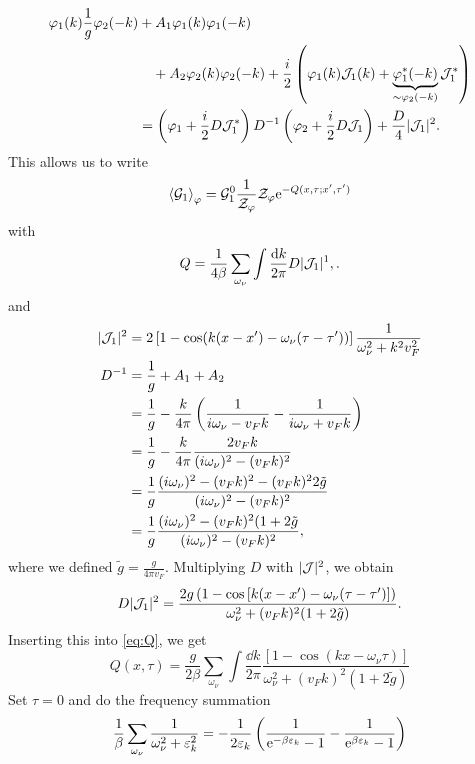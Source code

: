 \begin{align*}
\varphi_1(k)\frac{1}{g}\varphi_2(-k) &+ A_1\varphi_1(k)\varphi_1(-k) \\
&\quad + A_2\varphi_2(k)\varphi_2(-k) + \frac i2\left(\varphi_1(k)\mathcal{J}_1(k) + \underbrace{\varphi_1^*(-k)}_{\sim\varphi_2(-k)}\mathcal{J}_1^*\right) \\
&= \left(\varphi_1+\frac{i}{2}D\mathcal{J}_1^*\right)D^{-1}\left(\varphi_2+\frac{i}{2}D\mathcal{J}_1\right) + \frac{D}{4}|\mathcal{J}_1|^2. 
\end{align*}
This allows us to write
\begin{equation}
\label{eq:gre_almost_final}
\ev{\gre_1}_\p = \gre_1^0\frac{1}{\Z_\p}\Z_\p\e^{-Q(x, \tau;x',\tau')}
\end{equation}
with
\begin{equation}
\label{eq:Q}
Q = \frac{1}{4\beta}\sum_{\omega_\nu}\int\frac{\dd{k}}{2\pi}D|\mathcal{J}_1|^1, .
\end{equation}
and
\begin{align*}
|\mathcal{J}_1|^2 &= 2\left[1-\cos(k(x-x')-\omega_\nu(\tau-\tau'))\right]\frac{1}{\omega_\nu^2 + k^2v_F^2}\\
D^{-1} &= \frac{1}{g} + A_1+A_2 \\
&= \frac1g-\frac{k}{4\pi}\left(\frac{1}{i\omega_\nu - v_Fk}-\frac{1}{i\omega_\nu+v_Fk}\right) \\
&=\frac{1}{g}-\frac{k}{4\pi}\frac{2v_Fk}{(i\omega_\nu)^2-(v_Fk)^2} \\
&=\frac{1}{g}\frac{(i\omega_\nu)^2-(v_Fk)^2-(v_Fk)^22\tilde{g}}{(i\omega_\nu)^2-(v_Fk)^2} \\
&= \frac1g \frac{(i\omega_\nu)^2-(v_Fk)^2(1+2\tilde{g}}{(i\omega_\nu)^2-(v_Fk)^2},
\end{align*}
where we defined \(\tilde{g} = \frac{g}{4\pi v_F}\). Multiplying \(D\) with \(|\mathcal{J}|^2\), we obtain
\begin{equation}
D|\mathcal{J}_1|^2 = \frac{2g\left(1-\cos\left[k(x-x')-\omega_\nu(\tau-\tau')\right]\right)}{\omega_\nu^2+(v_Fk)^2(1+2\tilde{g})}.
\end{equation}
Inserting this into \cref{eq:Q}, we get
\begin{equation}
\label{eq:Q_1}
Q(x, \tau) = \frac{g}{2\beta}\sum_{\omega_\nu}\int\frac{\dd{k}}{2\pi}\frac{\left[1-\cos\left(kx-\omega_\nu\tau\right)\right]}{\omega_\nu^2+(v_Fk)^2(1+2\tilde{g})}
\end{equation}
Set \(\tau = 0\) and do the frequency summation
\begin{equation*}
	\frac1\beta\sum_{\omega_\nu}\frac{1}{\omega_\nu^2 +\varepsilon_k^2} = -\frac{1}{2\varepsilon_k}\left(\frac{1}{\mathrm{e}^{-\beta\varepsilon_k}-1} - \frac{1}{\mathrm{e}^{\beta\varepsilon_k}-1}\right)
\end{equation*}
